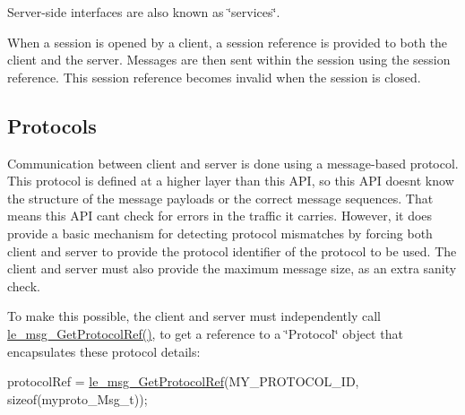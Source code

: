 Server-\/side interfaces are also known as \char`\"{}services\char`\"{}.

When a session is opened by a client, a session reference is provided to both the client and the server. Messages are then sent within the session using the session reference. This session reference becomes invalid when the session is closed.\hypertarget{c_messaging_c_messagingProtocols}{}\subsection{Protocols}\label{c_messaging_c_messagingProtocols}
Communication between client and server is done using a message-\/based protocol. This protocol is defined at a higher layer than this A\+P\+I, so this A\+P\+I doesn\textquotesingle{}t know the structure of the message payloads or the correct message sequences. That means this A\+P\+I can\textquotesingle{}t check for errors in the traffic it carries. However, it does provide a basic mechanism for detecting protocol mismatches by forcing both client and server to provide the protocol identifier of the protocol to be used. The client and server must also provide the maximum message size, as an extra sanity check.

To make this possible, the client and server must independently call {\ttfamily \hyperlink{le__messaging_8h_adcd1ff1a6906433aaa6d7038125c4473}{le\+\_\+msg\+\_\+\+Get\+Protocol\+Ref()}}, to get a reference to a \char`\"{}\+Protocol\char`\"{} object that encapsulates these protocol details\+:


\begin{DoxyCode}
protocolRef = \hyperlink{le__messaging_8h_adcd1ff1a6906433aaa6d7038125c4473}{le\_msg\_GetProtocolRef}(MY\_PROTOCOL\_ID, \textcolor{keyword}{sizeof}(myproto\_Msg\_t));
\end{DoxyCode}


